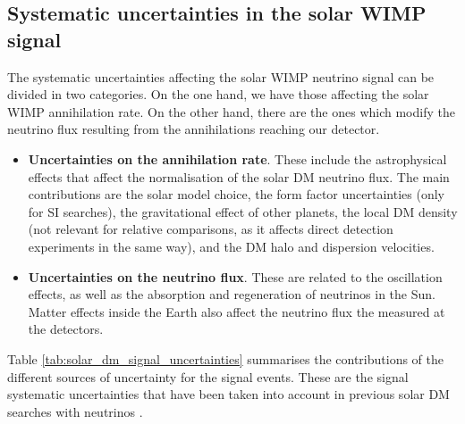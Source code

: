 \subsection{Systematic uncertainties in the solar WIMP signal}

The systematic uncertainties affecting the solar WIMP neutrino signal can be divided in two categories. On the one hand, we have those affecting the solar WIMP annihilation rate. On the other hand, there are the ones which modify the neutrino flux resulting from the annihilations reaching our detector.

\begin{itemize}
	\item \textbf{Uncertainties on the annihilation rate}. These include the astrophysical effects that affect the normalisation of the solar DM neutrino flux. The main contributions are the solar model choice, the form factor uncertainties (only for SI searches), the gravitational effect of other planets, the local DM density (not relevant for relative comparisons, as it affects direct detection experiments in the same way), and the DM halo and dispersion velocities.
	\item \textbf{Uncertainties on the neutrino flux}. These are related to the oscillation effects, as well as the absorption and regeneration of neutrinos in the Sun. Matter effects inside the Earth also affect the neutrino flux the measured at the detectors.
\end{itemize}

Table \ref{tab:solar_dm_signal_uncertainties} summarises the contributions of the different sources of uncertainty for the signal events. These are the signal systematic uncertainties that have been taken into account in previous solar DM searches with neutrinos \cite{Boliev2013,Super-Kamiokande2015,Principato2021}.

